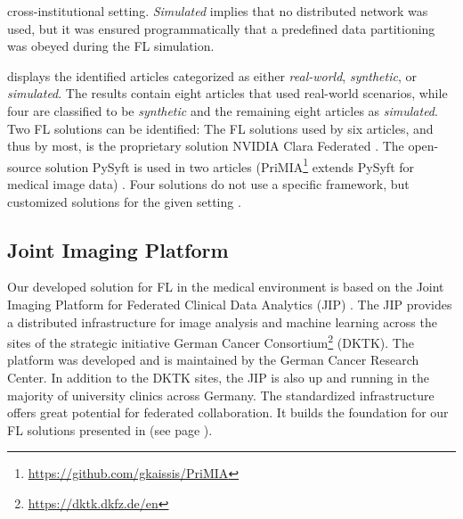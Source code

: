 cross-institutional setting.
\textit{Simulated} implies that no distributed network was used, but it was ensured programmatically that a predefined data partitioning was obeyed during the FL simulation.

 displays the identified articles categorized as either \textit{real-world}, \textit{synthetic}, or \textit{simulated}. The results contain eight articles that used real-world scenarios, while four are classified to be \textit{synthetic} and the remaining eight articles as \textit{simulated}.
Two FL solutions can be identified: The FL solutions used by six articles, and thus by most, is the proprietary solution NVIDIA Clara Federated \citep{Wang2020AutomatedLearning, Roth2020FederatedImplementation, Sarma2021FederatedSharing, Yang2021FederatedJapan, Li2019Privacy-preservingSegmentation, Flores2021FederatedPatients}. The open-source solution PySyft is used in two articles (PriMIA\footnote{\url{https://github.com/gkaissis/PriMIA}} extends PySyft for medical image data) \citep{Kaissis2021End-to-endImaging, Lee2021FederatedEnvironment}.  
Four solutions do not use a specific framework, but customized solutions for the given setting \citep{Xu2020ADiagnosis, Remedios2020DistributedSegmentation, Remedios2019DistributedInjury, Dou2021FederatedStudy}.



\subsection{Joint Imaging Platform}
\label{subsec:JIP}

Our developed solution for FL in the medical environment is based on the Joint Imaging Platform for Federated Clinical Data Analytics (JIP) \citep{Scherer2020JointAnalytics}.
The JIP provides a distributed infrastructure for image analysis and machine learning across the sites of the strategic initiative German Cancer Consortium\footnote{\url{https://dktk.dkfz.de/en}} (DKTK). The platform was developed and is maintained by the German Cancer Research Center. In addition to the DKTK sites, the JIP is also up and running in the majority of university clinics across Germany. The standardized infrastructure offers great potential for federated collaboration. It builds the foundation for our FL solutions presented in  (see page \pageref{sec:Methods}).


